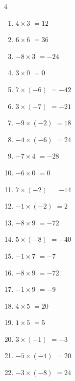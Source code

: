 \begin{multicols}{4}
\begin{enumerate}
  \item $4\times 3$
        $=12$

\columnbreak %

  \item $6\times 6$
        $=36$

  \item $-8\times 3$
        $=-24$

  \item $3\times 0$
        $=0$

  \item $7\times (-6)$
        $=-42$

  \item $3\times (-7)$
        $=-21$

  \item $-9\times (-2)$
        $=18$

  \item $-4\times (-6)$
        $=24$

  \item $-7\times 4$
        $=-28$

  \item $-6\times 0$
        $=0$

  \item $7\times (-2)$
        $=-14$

  \item $-1\times (-2)$
        $=2$

  \item $-8\times 9$
        $=-72$

  \item $5\times (-8)$
        $=-40$

  \item $-1\times 7$
        $=-7$

  \item $-8\times 9$
        $=-72$

  \item $-1\times 9$
        $=-9$

  \item $4\times 5$
        $=20$

  \item $1\times 5$
        $=5$

  \item $3\times (-1)$
        $=-3$

  \item $-5\times (-4)$
        $=20$

  \item $-3\times (-8)$
        $=24$


\end{enumerate}
\end{multicols}
